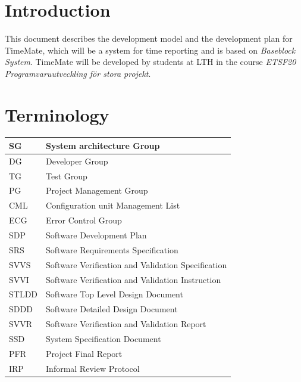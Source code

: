 \documentclass{article}
\date {#1}
\title {
    \documentNumber {01}    %
    \documentVersion {0.2}
    \documentTitle {Software Development Plan}
    \documentGroup {2}
    \documentResponsible {(PG) Project Management Group}
    \documentAuthors {(PG) Project Management Group}
    \documentDate {2021-02-02}
}
\begin{document}
\maketitle
\thispagestyle{empty}

\newpage

\tableofcontents

\newpage

\section{Introduction}
    This document describes the development model and the development plan for TimeMate, 
    which will be a system for time reporting and is based on \textit{Baseblock System}.
    TimeMate will be developed by students at LTH in the course 
    \textit{ETSF20 Programvaruutveckling för stora projekt}.

\section{Terminology}
    \renewcommand{\arraystretch}{1.7}  %
    
    \begin{table}[h]
        \centering
        \begin{tabular}{| l | l |}
            \hline
                SG & System architecture Group \\
            \hline
                DG & Developer Group \\
            \hline
                TG & Test Group \\
            \hline
                PG & Project Management Group \\
            \hline 
                CML & Configuration unit Management List \\
            \hline            
                ECG & Error Control Group \\
            \hline
                SDP & Software Development Plan \\
            \hline
                SRS & Software Requirements Specification \\
            \hline
                SVVS & Software Verification and Validation Specification \\
            \hline
                SVVI & Software Verification and Validation Instruction \\
            \hline
                STLDD & Software Top Level Design Document \\
            \hline
                SDDD & Software Detailed Design Document \\
            \hline
                SVVR & Software Verification and Validation Report \\
            \hline
                SSD & System Specification Document \\
            \hline
                PFR & Project Final Report \\
            \hline
                IRP & Informal Review Protocol \\
            \hline
        \end{tabular}
    \end{table}
\end{document}
